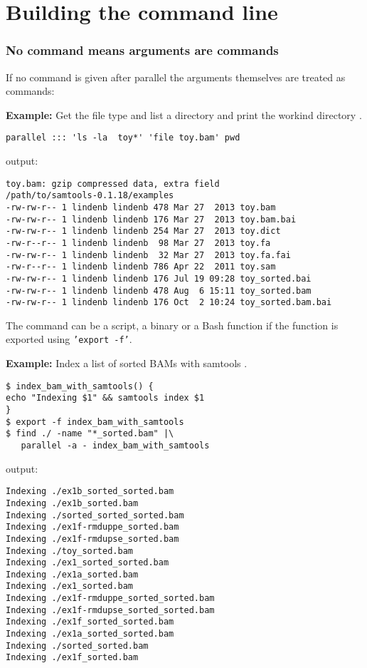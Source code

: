 \documentclass{article}
\newcommand{\example}[1]{
\textbf{Example: } {\color[rgb]{0,0,1} #1 } .
}
\newcommand{\cmdoption}[1]{\texttt{'#1'}}
\begin{document}
\section{Building the command line}

\subsubsection{No command means arguments are commands}

If no command is given after parallel the arguments themselves are treated as commands:
\example{Get the file type and list a directory and print the workind directory}
\begin{lstlisting}
parallel ::: 'ls -la  toy*' 'file toy.bam' pwd
\end{lstlisting}
output:
\begin{lstlisting}
toy.bam: gzip compressed data, extra field
/path/to/samtools-0.1.18/examples
-rw-rw-r-- 1 lindenb lindenb 478 Mar 27  2013 toy.bam
-rw-rw-r-- 1 lindenb lindenb 176 Mar 27  2013 toy.bam.bai
-rw-rw-r-- 1 lindenb lindenb 254 Mar 27  2013 toy.dict
-rw-r--r-- 1 lindenb lindenb  98 Mar 27  2013 toy.fa
-rw-rw-r-- 1 lindenb lindenb  32 Mar 27  2013 toy.fa.fai
-rw-r--r-- 1 lindenb lindenb 786 Apr 22  2011 toy.sam
-rw-rw-r-- 1 lindenb lindenb 176 Jul 19 09:28 toy_sorted.bai
-rw-rw-r-- 1 lindenb lindenb 478 Aug  6 15:11 toy_sorted.bam
-rw-rw-r-- 1 lindenb lindenb 176 Oct  2 10:24 toy_sorted.bam.bai
\end{lstlisting}

The command can be a script, a binary or a Bash function if the function is exported using \cmdoption{export -f}.
\example{Index a list of sorted BAMs with samtools}
\begin{lstlisting}
$ index_bam_with_samtools() {
echo "Indexing $1" && samtools index $1
}
$ export -f index_bam_with_samtools
$ find ./ -name "*_sorted.bam" |\
   parallel -a - index_bam_with_samtools
\end{lstlisting}
output:
\begin{lstlisting}
Indexing ./ex1b_sorted_sorted.bam
Indexing ./ex1b_sorted.bam
Indexing ./sorted_sorted_sorted.bam
Indexing ./ex1f-rmduppe_sorted.bam
Indexing ./ex1f-rmdupse_sorted.bam
Indexing ./toy_sorted.bam
Indexing ./ex1_sorted_sorted.bam
Indexing ./ex1a_sorted.bam
Indexing ./ex1_sorted.bam
Indexing ./ex1f-rmduppe_sorted_sorted.bam
Indexing ./ex1f-rmdupse_sorted_sorted.bam
Indexing ./ex1f_sorted_sorted.bam
Indexing ./ex1a_sorted_sorted.bam
Indexing ./sorted_sorted.bam
Indexing ./ex1f_sorted.bam
\end{lstlisting}
\end{document}
